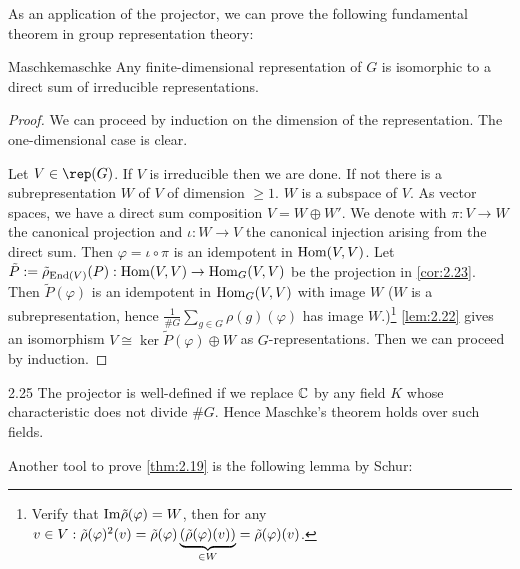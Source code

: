 \documentclass[twoside = false,	%
		headsepline,		%
		parskip = true,
		]{scrbook}						%
\begin{document}
    As an application of the projector, we can prove the following fundamental theorem in group representation theory:

    \begin{theorem}{Maschke}{maschke}
        Any finite-dimensional representation of $G$ is isomorphic to a direct sum of irreducible representations.
    \end{theorem}
    \begin{proof}
        We can proceed by induction on the dimension of the representation. The one-dimensional case is clear.

        Let $V\in\rep(G)$. If $V$ is irreducible then we are done. If not there is a subrepresentation $W$ of $V$ of dimension $\geq 1$. $W$ is a subspace of $V$. As vector spaces, we have a direct sum composition $V=W\oplus W'$. We denote with $\pi: V \to W$ the canonical projection and $\iota: W\to V$ the canonical injection arising from the direct sum. Then $\varphi=\iota\circ\pi$ is an idempotent in $\mathrm{Hom}(V,V)$. Let $\tilde P:=\tilde \rho_{\mathrm{End}(V)}(P):\mathrm{Hom}(V,V)\to \mathrm{Hom}_G(V,V)$ be the projection in \ref{cor:2.23}. Then $\tilde P(\varphi)$ is an idempotent in $\mathrm{Hom}_G(V,V)$ with image $W$ ($W$ is a subrepresentation, hence $\frac1{\# G}\sum_{g\in G}\rho(g)(\varphi)$ has image $W$.)\footnote{Verify that $\mathrm{Im} \tilde{\rho} (\varphi)=W$, then for any $v\in V: \tilde\rho(\varphi)^2(v)=\tilde\rho(\varphi)\underbrace{\left( \tilde\rho(\varphi)(v)\right)}_{\in W} = \tilde\rho(\varphi)(v)$.}
        \ref{lem:2.22} gives an isomorphism $V\cong \ker\tilde P(\varphi)\oplus W$ as $G$-representations. Then we can proceed by induction.
    \end{proof}

    \begin{remark}{}{2.25}
        The projector is well-defined if we replace $\mathbb C$ by any field $K$ whose characteristic does not divide $\#G$. Hence Maschke's theorem holds over such fields.
    \end{remark}

    Another tool to prove \ref{thm:2.19} is the following lemma by Schur:
\end{document}
